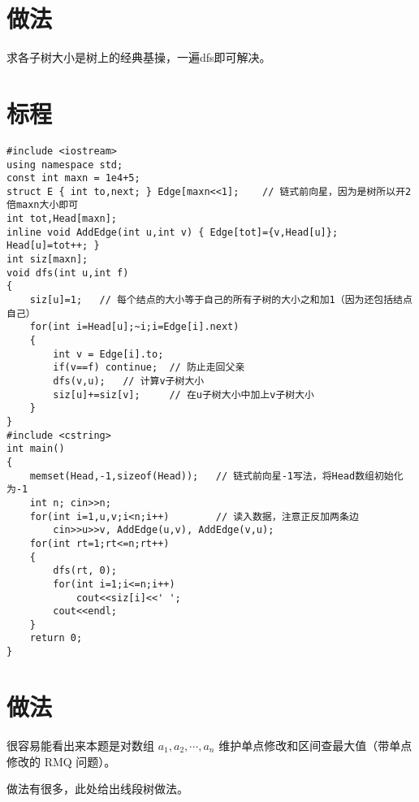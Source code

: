 \documentclass{ctsol}
\begin{document}
\makesolution
\section*{做法}
求各子树大小是树上的经典基操，一遍dfs即可解决。

\section*{标程}
\begin{lstlisting}
#include <iostream>
using namespace std;
const int maxn = 1e4+5;
struct E { int to,next; } Edge[maxn<<1];    // 链式前向星，因为是树所以开2倍maxn大小即可
int tot,Head[maxn];
inline void AddEdge(int u,int v) { Edge[tot]={v,Head[u]}; Head[u]=tot++; }
int siz[maxn];
void dfs(int u,int f)
{
    siz[u]=1;   // 每个结点的大小等于自己的所有子树的大小之和加1（因为还包括结点自己）
    for(int i=Head[u];~i;i=Edge[i].next)
    {
        int v = Edge[i].to;
        if(v==f) continue;  // 防止走回父亲
        dfs(v,u);   // 计算v子树大小
        siz[u]+=siz[v];     // 在u子树大小中加上v子树大小
    }
}
#include <cstring>
int main()
{
    memset(Head,-1,sizeof(Head));   // 链式前向星-1写法，将Head数组初始化为-1
    int n; cin>>n;
    for(int i=1,u,v;i<n;i++)        // 读入数据，注意正反加两条边
        cin>>u>>v, AddEdge(u,v), AddEdge(v,u);
    for(int rt=1;rt<=n;rt++)
    {
        dfs(rt, 0);
        for(int i=1;i<=n;i++)
            cout<<siz[i]<<' ';
        cout<<endl;
    }
    return 0;
}
\end{lstlisting}

\makesolution
\section*{做法}
很容易能看出来本题是对数组 $a_1,a_2,\cdots,a_n$ 维护单点修改和区间查最大值（带单点修改的 RMQ 问题）。

做法有很多，此处给出线段树做法。
\end{document}
